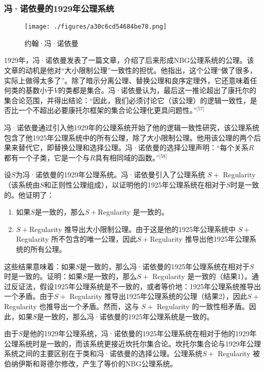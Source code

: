 \subsubsection{冯·诺依曼的1929年公理系统}
\begin{figure}[ht]
\centering
\texttt{[image: ./figures/a30c6cd54684be78.png]}
\caption{约翰·冯·诺依曼} \label{fig_NBG_2}
\end{figure}
1929年，冯·诺依曼发表了一篇文章，介绍了后来形成NBG公理系统的公理。该文章的动机是他对“大小限制公理”一致性的担忧。他指出，这个公理“做了很多，实际上做得太多了”。除了暗示分离公理、替换公理和良序定理外，它还意味着任何类的基数小于\(V\)的类都是集合。冯·诺依曼认为，最后这一推论超出了康托尔的集合论范围，并得出结论：“因此，我们必须讨论它（该公理）的逻辑一致性，是否比一个不超出必要康托尔框架的集合论公理化更具问题性。”\(^\text{[57]}\)

冯·诺依曼通过引入他1929年的公理系统开始了他的逻辑一致性研究，该公理系统包含了他1925年公理系统中的所有公理，除了大小限制公理。他用该公理的两个后果来替代它，即替换公理和选择公理。冯·诺依曼的选择公理声明：“每个关系\(R\)都有一个子类，它是一个与\(R\)具有相同域的函数。”\(^\text{[58]}\)

设\( S \)为冯·诺依曼的1929年公理系统。冯·诺依曼引入了公理系统 \( S + \) Regularity（该系统由\( S \)和正则性公理组成），以证明他的1925年公理系统在相对于\( S \)时是一致的。他证明了：

\begin{enumerate}
\item 如果\( S \)是一致的，那么\( S + \)Regularity 是一致的。
\item \( S + \)Regularity 推导出大小限制公理。由于这是他的1925年公理系统中 \( S + \)Regularity 所不包含的唯一公理，因此\( S + \)Regularity 推导出他1925年公理系统的所有公理。
\end{enumerate}
这些结果意味着：如果\( S \)是一致的，那么冯·诺依曼的1925年公理系统在相对于\( S \)时是一致的。证明：如果\( S \)是一致的，那么\( S + \) Regularity 是一致的（结果1）。通过反证法，假设1925年公理系统是不一致的，或者等价地：1925年公理系统推导出一个矛盾。由于\( S + \) Regularity 推导出1925年公理系统的公理（结果2），因此\( S + \) Regularity 也推导出一个矛盾。然而，这与 \( S + \) Regularity 的一致性相矛盾。因此，如果\( S \)是一致的，那么冯·诺依曼的1925年公理系统是一致的。

由于\( S \)是他的1929年公理系统，冯·诺依曼的1925年公理系统在相对于他的1929年公理系统时是一致的，而该系统更接近坎托尔集合论。坎托尔集合论与1929年公理系统之间的主要区别在于类和冯·诺依曼的选择公理。公理系统\( S + \) Regularity 被伯纳伊斯和哥德尔修改，产生了等价的NBG公理系统。
